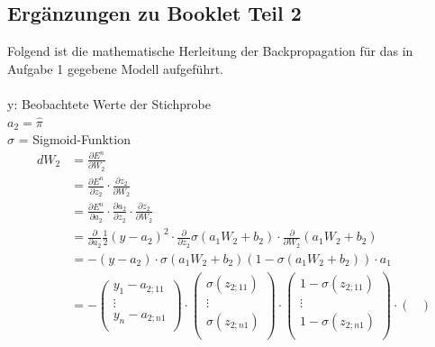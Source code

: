 \subsection{Ergänzungen zu Booklet Teil 2}
Folgend ist die mathematische Herleitung der Backpropagation für das in Aufgabe 1 gegebene Modell aufgeführt.\\\\
y: Beobachtete Werte der Stichprobe\\
$a_{2}=\hat{\pi}$\\
$\sigma$ = Sigmoid-Funktion
\begin{align*}
    dW_{2} &= \frac{\partial E^{n}}{\partial W_{2}}\\
    &= \frac{\partial E^{n}}{\partial z_{2}}\cdot \frac{\partial z_{2}}{\partial W_{2}}\\
    &= \frac{\partial E^{n}}{\partial a_{2}} \cdot \frac{\partial a_{2}}{\partial z_{2}} \cdot \frac{\partial z_{2}}{\partial W_{2}}\\
    &= \frac{\partial }{\partial a_{2}} \frac{1}{2}(y-a_{2})^{2} \cdot \frac{\partial }{\partial z_{2}} \sigma(a_{1}W_{2} + b_{2})\cdot \frac{\partial }{\partial W_{2}}(a_{1}W_{2}+b_{2})\\
    &= -(y-a_{2}) \cdot \sigma(a_{1}W_{2}+b_{2})(1-\sigma(a_{1}W_{2}+b_{2}))\cdot a_{1}\\
    &=-\begin{pmatrix}
        y_{1}  -  a_{2;11} \\
        \vdots \\
        y_{n}  -  a_{2;n1}  \\
        \end{pmatrix} \cdot \begin{pmatrix}
                            \sigma (z_{2;11}) \\
                            \vdots \\
                            \sigma (z_{2;n1})  \\
                            \end{pmatrix} \cdot \begin{pmatrix}
                                                    1-\sigma (z_{2;11}) \\
                                                    \vdots \\
                                                    1-\sigma (z_{2;n1})  \\
                                                    \end{pmatrix} \cdot \begin{pmatrix}

\end{pmatrix}
\end{align*}

